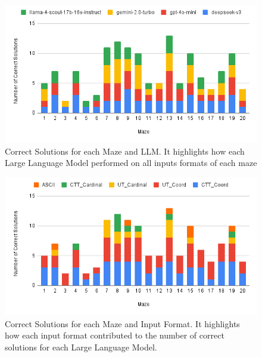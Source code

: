 \documentclass[conference]{IEEEtran}
\begin{document}
\begin{figure}[htbp]
  \centering
  \includegraphics[width=\columnwidth]{Correct Solutions for each Maze and Large Language Model.png}
  \caption{Correct Solutions for each Maze and LLM. It highlights how each Large Language Model performed on all inputs formats of each maze}
  \label{fig:llm_maze_solution}
\end{figure}

\begin{figure}[htbp]
  \centering
  \includegraphics[width=\columnwidth]{Correct Solutions for each Maze and Input Format.png}
  \caption{Correct Solutions for each Maze and Input Format. It highlights how each input format contributed to the number of correct solutions for each Large Language Model.}
  \label{fig:input_maze_solution}
\end{figure}
\end{document}
